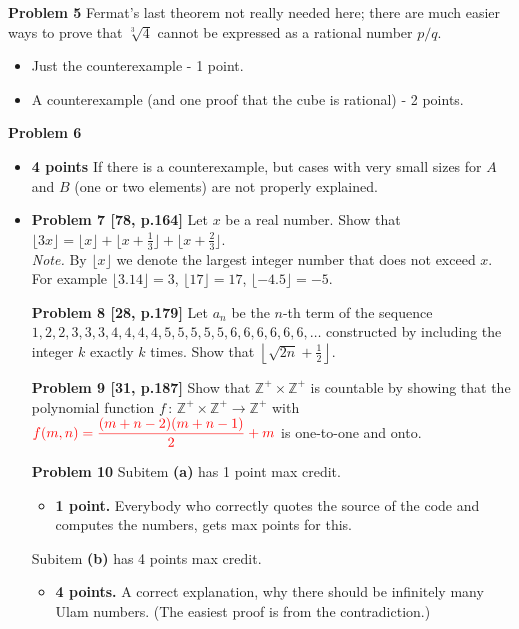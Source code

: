 \documentclass[jou]{apa6}
\begin{document}
\begin{enumerete}
\begin{enumerete}
\vspace{2ex}
{\bf Problem 5} 
Fermat's last theorem not really needed here; there are much easier ways to 
prove that $\sqrt[3]{4}$ cannot be expressed as a rational number $p/q$.
\begin{itemize}
\item Just the counterexample - 1 point.
\item A counterexample (and one proof that the cube is rational) - 2 points.
\end{itemize}



\vspace{2ex}
{\bf Problem 6}
\begin{itemize}
\item {\bf 4 points} If there is a counterexample, but cases with very small sizes for $A$
and $B$ (one or two elements) are not properly explained.
\item 

\vspace{2ex}
{\bf Problem 7 [78, p.164]}
Let $x$ be a real number. Show that 
$\lfloor 3x \rfloor = \lfloor x \rfloor + \lfloor x + \frac{1}{3} \rfloor +
\lfloor x + \frac{2}{3} \rfloor$.\\
{\color{red} {\em Note.} By $\lfloor x \rfloor$ we denote the 
largest integer number that does not exceed $x$. 
For example $\lfloor 3.14 \rfloor = 3$, $\lfloor 17 \rfloor = 17$, 
$\lfloor -4.5 \rfloor = -5$. }

\vspace{2ex}
{\bf Problem 8 [28, p.179]}
Let $a_n$ be the $n$-th term of the sequence $1, 2,2, 3,3,3, 4,4,4,4, 5,5,5,5,5, 6,6,6,6,6,6,\ldots$
constructed by including the integer $k$ exactly $k$ times. Show that 
${\displaystyle \left\lfloor \sqrt{2n} + \frac{1}{2} \right\rfloor}$. 


\vspace{2ex}
{\bf Problem 9 [31, p.187]}
Show that $\mathbb{Z}^{+} \times \mathbb{Z}^{+}$ is countable by showing that
the polynomial function $f\,:\,\mathbb{Z}^{+} \times \mathbb{Z}^{+} \rightarrow \mathbb{Z}^{+}$
with $\color{red} {\displaystyle f(m,n) = \frac{(m+n-2)(m+n-1)}{2} + m}$ is one-to-one and onto.

\vspace{2ex}
{\bf Problem 10}
Subitem {\bf (a)} has 1 point max credit.
\begin{itemize}
\item {\bf 1 point.} Everybody who correctly quotes the source of the code and 
computes the numbers, gets max points for this.
\end{itemize}
Subitem {\bf (b)} has 4 points max credit.
\begin{itemize}
\item {\bf 4 points.} A correct explanation, why there should be infinitely many Ulam numbers. 
(The easiest proof is from the contradiction.)



\end{itemize}
\end{itemize}
\end{enumerete}
\end{enumerete}
\end{document}
